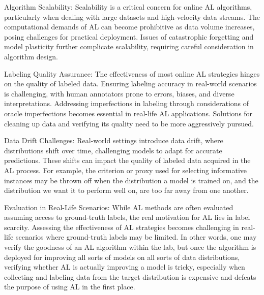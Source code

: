 \documentclass[
  letterpaper,
  numbers=noenddot,
  DIV=11]{scrreprt}
\theoremstyle{plain}
\theoremstyle{definition}
\theoremstyle{remark}
\begin{document}
Algorithm Scalability: Scalability is a critical concern for online AL
algorithms, particularly when dealing with large datasets and
high-velocity data streams. The computational demands of AL can become
prohibitive as data volume increases, posing challenges for practical
deployment. Issues of catastrophic forgetting and model plasticity
further complicate scalability, requiring careful consideration in
algorithm design.

Labeling Quality Assurance: The effectiveness of most online AL
strategies hinges on the quality of labeled data. Ensuring labeling
accuracy in real-world scenarios is challenging, with human annotators
prone to errors, biases, and diverse interpretations. Addressing
imperfections in labeling through considerations of oracle imperfections
becomes essential in real-life AL applications. Solutions for cleaning
up data and verifying its quality need to be more aggressively pursued.

Data Drift Challenges: Real-world settings introduce data drift, where
distributions shift over time, challenging models to adapt for accurate
predictions. These shifts can impact the quality of labeled data
acquired in the AL process. For example, the criterion or proxy used for
selecting informative instances may be thrown off when the distribution
a model is trained on, and the distribution we want it to perform well
on, are too far away from one another.

Evaluation in Real-Life Scenarios: While AL methods are often evaluated
assuming access to ground-truth labels, the real motivation for AL lies
in label scarcity. Assessing the effectiveness of AL strategies becomes
challenging in real-life scenarios where ground-truth labels may be
limited. In other words, one may verify the goodness of an AL algorithm
within the lab, but once the algorithm is deployed for improving all
sorts of models on all sorts of data distributions, verifying whether AL
is actually improving a model is tricky, especially when collecting and
labeling data from the target distribution is expensive and defeats the
purpose of using AL in the first place.
\end{document}
